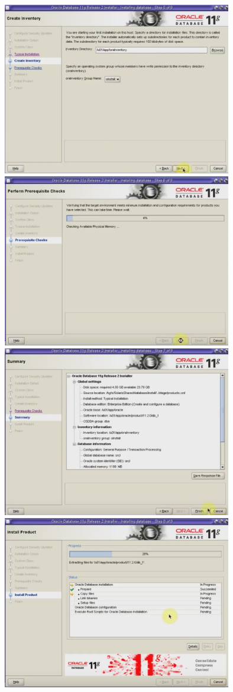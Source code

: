 \documentclass[a4paper,openright,12pt]{book}
\begin{document}
\begin{center}
\includegraphics[width=10cm]{./solari/15.png}\\
\includegraphics[width=10cm]{./solari/16.png}\\
\includegraphics[width=10cm]{./solari/17.png}\\
\includegraphics[width=10cm]{./solari/18.png}\\

\end{center}
\end{document}
